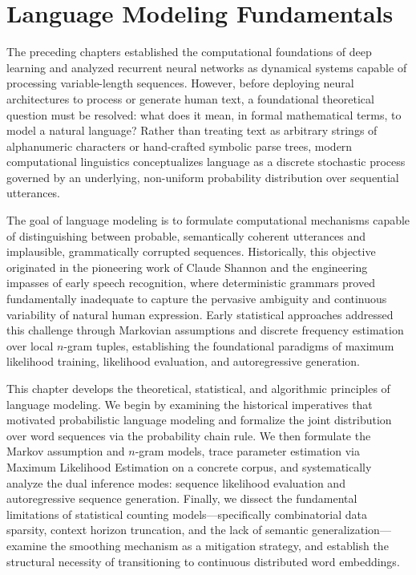 \documentclass[../../main.tex]{subfiles}
\begin{document}
\chapter{Language Modeling Fundamentals}
\label{ch:language_models}
\label{ch:language_models_intro}

The preceding chapters established the computational foundations of deep learning and analyzed recurrent neural networks as dynamical systems capable of processing variable-length sequences. However, before deploying neural architectures to process or generate human text, a foundational theoretical question must be resolved: what does it mean, in formal mathematical terms, to model a natural language? Rather than treating text as arbitrary strings of alphanumeric characters or hand-crafted symbolic parse trees, modern computational linguistics conceptualizes language as a discrete stochastic process governed by an underlying, non-uniform probability distribution over sequential utterances.

The goal of language modeling is to formulate computational mechanisms capable of distinguishing between probable, semantically coherent utterances and implausible, grammatically corrupted sequences. Historically, this objective originated in the pioneering work of Claude Shannon and the engineering impasses of early speech recognition, where deterministic grammars proved fundamentally inadequate to capture the pervasive ambiguity and continuous variability of natural human expression. Early statistical approaches addressed this challenge through Markovian assumptions and discrete frequency estimation over local $n$-gram tuples, establishing the foundational paradigms of maximum likelihood training, likelihood evaluation, and autoregressive generation.

This chapter develops the theoretical, statistical, and algorithmic principles of language modeling. We begin by examining the historical imperatives that motivated probabilistic language modeling and formalize the joint distribution over word sequences via the probability chain rule. We then formulate the Markov assumption and $n$-gram models, trace parameter estimation via Maximum Likelihood Estimation on a concrete corpus, and systematically analyze the dual inference modes: sequence likelihood evaluation and autoregressive sequence generation. Finally, we dissect the fundamental limitations of statistical counting models---specifically combinatorial data sparsity, context horizon truncation, and the lack of semantic generalization---examine the smoothing mechanism as a mitigation strategy, and establish the structural necessity of transitioning to continuous distributed word embeddings.
\end{document}
